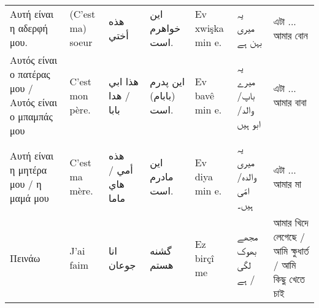 \begin{longtable}{p{3.5cm} p{3.5cm} p{3.5cm} p{3.5cm} p{3.5cm} p{3.5cm} p{3.5cm} }
 Αυτή είναι η αδερφή μου.                                                                                                      & (C'est ma) soeur                                                                                & هذه أختي                                                                              & این خواهرم است.                                             & Ev xwişka min e.                                                                   & یہ میری بہن ہے                                                                 & এটা ... আমার বোন                                                  \\
 Αυτός είναι ο πατέρας μου / Αυτός είναι ο μπαμπάς μου                                                                         & C'est mon père.                                                                                 & هذا ابي                  / هدا بابا                                                   & این پدرم (بابام) است.                                       & Ev bavê min e.                                                                     & یہ میرے باپ/ والد/ ابو ہیں                                                     & এটা ... আমার বাবা                                                 \\
 Αυτή είναι η μητέρα μου / η μαμά μου                                                                                          & C'est ma mère.                                                                                  & هذه أمي                      / هاي ماما                                               & این مادرم است.                                              & Ev diya min e.                                                                     & یہ میری والدہ/ امّی ہیں۔                                                       & এটা ... আমার মা                                                   \\
 Πεινάω                                                                                                                        & J'ai faim                                                                                       & انا جوعان                                                                             & گشنه هستم                                                   & Ez birçî me                                                                        & مجھے بھوک لگی ہے /                                                             & আমার খিদে লেগেছে / আমি ক্ষুধার্ত / আমি কিছু খেতে চাই              \\

\end{longtable}
